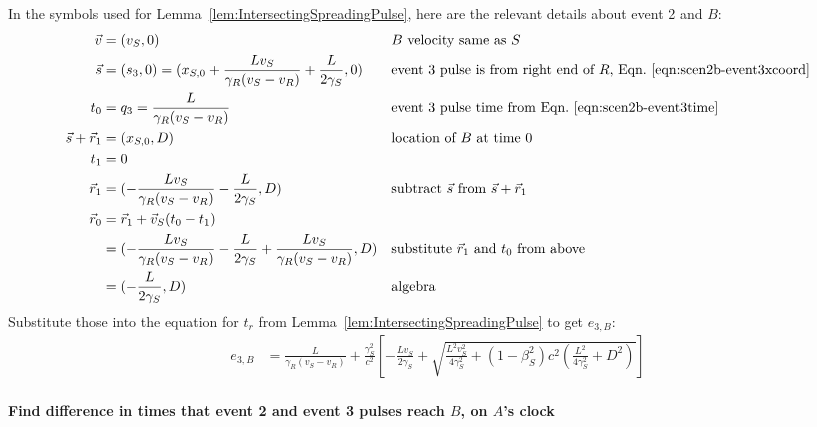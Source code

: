 \documentclass[a4paper]{article}
\theoremstyle{plain}
\theoremstyle{definition}
\newcommand{\vect}[1]{\vec{#1}}
\begin{document}
In the symbols used for Lemma~\ref{lem:IntersectingSpreadingPulse},
here are the relevant details about event 2 and $B$:
\begin{align*}
\vect{v} & = (v_S, 0) & & \text{$B$ velocity same as $S$} \\
\vect{s} & = (s_3,0) = (x_{S,0} + \frac{Lv_S}{\gamma_R(v_S - v_R)} + \frac{L}{2\gamma_S}, 0) & & \text{event 3 pulse is from right end of $R$, Eqn.~\eqref{eqn:scen2b-event3xcoord}} \\
t_0 & = q_3 = \frac{L}{\gamma_R(v_S - v_R)} & & \text{event 3 pulse time from Eqn.~\eqref{eqn:scen2b-event3time}} \\
\vect{s} + \vect{r}_1 & = (x_{S,0}, D) & & \text{location of $B$ at time 0} \\
t_1 & = 0 \\
\vect{r}_1 & = (-\frac{Lv_S}{\gamma_R(v_S - v_R)} - \frac{L}{2\gamma_S}, D) & & \text{subtract $\vect{s}$ from $\vect{s}+\vect{r}_1$} \\
\vect{r}_0
  & = \vect{r}_1 + \vect{v}_S(t_0-t_1) \\
  & = (-\frac{Lv_S}{\gamma_R(v_S - v_R)} - \frac{L}{2\gamma_S} + \frac{Lv_S}{\gamma_R(v_S - v_R)}, D) & & \text{substitute $\vect{r}_1$ and $t_0$ from above} \\
  & = (-\frac{L}{2\gamma_S}, D) & & \text{algebra}
\end{align*}
Substitute those into the equation for $t_r$ from
Lemma~\ref{lem:IntersectingSpreadingPulse} to get $e_{3,B}$:
\begin{align*}
e_{3,B} & = \frac{L}{\gamma_R(v_S - v_R)} + \frac{\gamma_S^2}{c^2} \left[ -\frac{Lv_S}{2\gamma_S} + \sqrt{\frac{L^2v_S^2}{4\gamma_S^2} + (1-\beta_S^2)c^2 (\frac{L^2}{4\gamma_S^2} + D^2)} \right]
\end{align*}


\paragraph{Find difference in times that event 2 and event 3 pulses reach $B$, on $A$'s clock}
\end{document}
